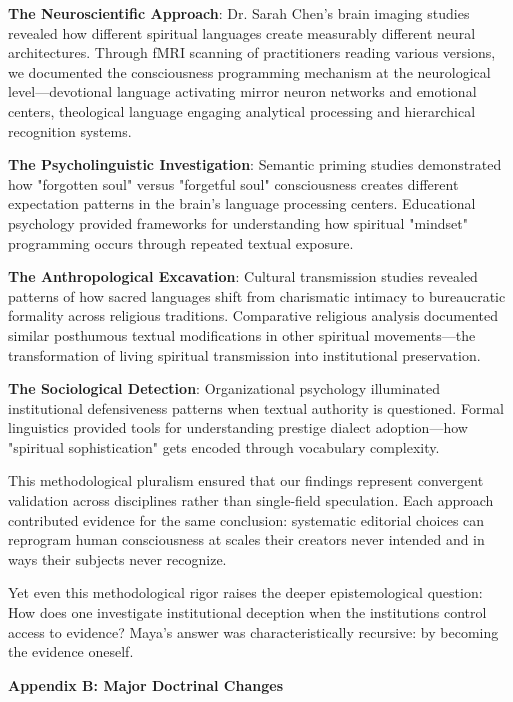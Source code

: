\documentclass[11pt,twoside]{book}
\begin{document}
\textbf{\textbf{The Neuroscientific Approach}}: Dr. Sarah Chen's brain imaging studies revealed how different spiritual languages create measurably different neural architectures. Through fMRI scanning of practitioners reading various versions, we documented the consciousness programming mechanism at the neurological level—devotional language activating mirror neuron networks and emotional centers, theological language engaging analytical processing and hierarchical recognition systems.

\textbf{\textbf{The Psycholinguistic Investigation}}: Semantic priming studies demonstrated how "forgotten soul" versus "forgetful soul" consciousness creates different expectation patterns in the brain's language processing centers. Educational psychology provided frameworks for understanding how spiritual "mindset" programming occurs through repeated textual exposure.

\textbf{\textbf{The Anthropological Excavation}}: Cultural transmission studies revealed patterns of how sacred languages shift from charismatic intimacy to bureaucratic formality across religious traditions. Comparative religious analysis documented similar posthumous textual modifications in other spiritual movements—the transformation of living spiritual transmission into institutional preservation.

\textbf{\textbf{The Sociological Detection}}: Organizational psychology illuminated institutional defensiveness patterns when textual authority is questioned. Formal linguistics provided tools for understanding prestige dialect adoption—how "spiritual sophistication" gets encoded through vocabulary complexity.

This methodological pluralism ensured that our findings represent convergent validation across disciplines rather than single-field speculation. Each approach contributed evidence for the same conclusion: systematic editorial choices can reprogram human consciousness at scales their creators never intended and in ways their subjects never recognize.

Yet even this methodological rigor raises the deeper epistemological question: How does one investigate institutional deception when the institutions control access to evidence? Maya's answer was characteristically recursive: by becoming the evidence oneself.

\clearpage
\thispagestyle{empty}
\mbox{}
\newpage
\pagestyle{sectionopening}
\thispagestyle{sectionopening}
\markboth{}{}
\markright{}
\vspace*{0.25\textheight}
\begin{center}
{\Huge\bfseries Appendix B: Major Doctrinal Changes}
\end{center}
\newpage
\end{document}
